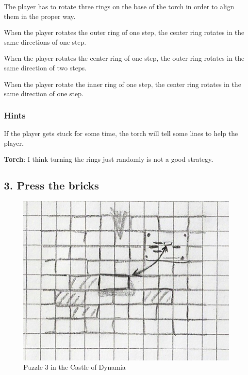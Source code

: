 The player has to rotate three rings on the base of the torch in order to align them in the proper way.

When the player rotates the outer ring of one step, the center ring rotates in the same directions of one step.

When the player rotates the center ring of one step, the outer ring rotates in the same direction of two steps.

When the player rotate the inner ring of one step, the center ring rotates in the same direction of one step.

\subsubsection*{Hints}
If the player gets stuck for some time, the torch will tell some lines to help the player.

\textbf{Torch}: I think turning the rings just randomly is not a good strategy.

\subsection{3. Press the bricks}

\begin{figure}[H]
  \centering
  \includegraphics[width=\textwidth]{Images/Puzzles/castleOfDynamia_3}
  \caption{Puzzle 3 in the Castle of Dynamia}
\end{figure}


